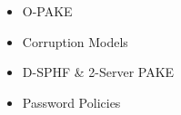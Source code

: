 \chapter{}\label{ch:pake}

\begin{itemize}
	\item O-PAKE
	\item Corruption Models
	\item D-SPHF \& 2-Server PAKE
	\item Password Policies
\end{itemize}